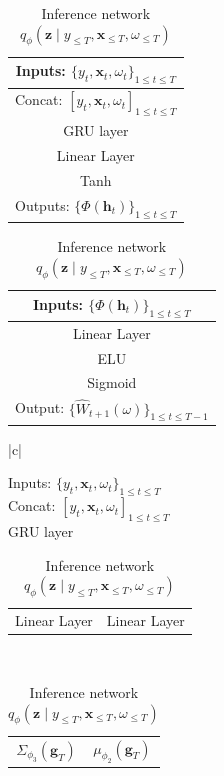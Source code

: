 \documentclass[10pt]{article} %
\begin{document}
\begin{table}[!htbp]
\centering
\begin{minipage}{0.33\textwidth}
\centering
\begin{tabular}{|c|}
\hline Inputs: $\{y_{t}, \mathbf{x}_{t}, \omega_{t}\}_{ 1 \leq t \leq T}$ \\
\hline Concat: $[y_{t}, \mathbf{x}_{t}, \omega_{t}]_{ 1 \leq t \leq T}$ \\
\hline GRU layer \\
\hline Linear Layer \\
\hline Tanh  \\
\hline Outputs: $\{\Phi(\textbf{h}_t)\}_{ 1 \leq t \leq T}$\\ \hline
\end{tabular}
\caption{Architecture: representation learner $\phi$ of CDVAE}
\label{tab:archi_phi_rep_learner}
\end{minipage}%
\begin{minipage}{0.33\textwidth}
\centering
\begin{tabular}{|c|}
\hline Inputs: $\{\Phi(\mathbf{h}_t)\}_{ 1 \leq t \leq T}$ \\
\hline Linear Layer \\
\hline ELU  \\
\hline Sigmoid  \\
\hline Output: $\{\hat{W}_{t+1}(\omega)\}_{ 1 \leq t \leq T-1}$ 
 \\ \hline\end{tabular}
\caption{Architecture: propensity network  $e_{\theta_{\omega}}(.)$.}
\label{tab:archi_e_theta}
\end{minipage}
\begin{minipage}{0.33\textwidth}
\centering
\begin{tabular}{|c|} \hline 

Inputs: $\{y_{t}, \mathbf{x}_{t}, \omega_{t}\}_{1 \leq t \leq T}$ \\ \hline  
Concat: $[y_{t}, \mathbf{x}_{t}, \omega_{t}]_{1 \leq t \leq T}$ \\ \hline  
GRU layer \\ \hline 

\begin{tabular}{c|c}  Linear Layer & Linear Layer  \end{tabular}\\ \hline 

\begin{tabular}{c|c}  $\Sigma_{\phi_3}\left(\mathbf{g}_T\right)$ & $\mu_{\phi_2}\left(\mathbf{g}_T\right)$ \end{tabular}\\ \hline 

\end{tabular}
\caption{Inference network $q_\phi\left(\mathbf{z} \mid y_{\leq T}, \mathbf{x}_{\leq T}, \omega_{\leq T}\right)$}
\label{tab:archi_inf_net}
\end{minipage}
\end{table}
\end{document}
